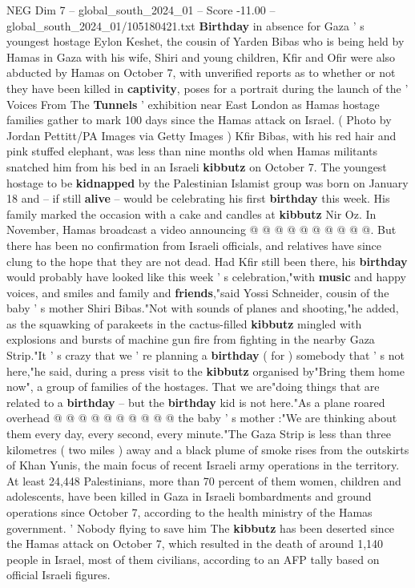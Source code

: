 \begin{textsample}{NEG Dim 7 – global\_south\_2024\_01 – Score -11.00 – global\_south\_2024\_01/105180421.txt}  \label{ex:f7_neg_401}
\textbf{Birthday} in absence for Gaza ' s youngest hostage Eylon Keshet, the cousin of Yarden Bibas who is being held by Hamas in Gaza with his wife, Shiri and young children, Kfir and Ofir were also abducted by Hamas on October 7, with unverified reports as to whether or not they have been killed in \textbf{captivity}, poses for a portrait during the launch of the ' Voices From The \textbf{Tunnels} ' exhibition near East London as Hamas hostage families gather to mark 100 days since the Hamas attack on Israel. ( Photo by Jordan Pettitt/PA Images via Getty Images ) Kfir Bibas, with his red hair and pink stuffed elephant, was less than nine months old when Hamas militants snatched him from his bed in an Israeli \textbf{kibbutz} on October 7.
The youngest hostage to be \textbf{kidnapped} by the Palestinian Islamist group was born on January 18 and -- if still \textbf{alive} -- would be celebrating his first \textbf{birthday} this week.
His family marked the occasion with a cake and candles at \textbf{kibbutz} Nir Oz.
In November, Hamas broadcast a video announcing @ @ @ @ @ @ @ @ @ @.
But there has been no confirmation from Israeli officials, and relatives have since clung to the hope that they are not dead.
Had Kfir still been there, his \textbf{birthday} would probably have looked like this week ' s celebration,"with \textbf{music} and happy voices, and smiles and family and \textbf{friends},"said Yossi Schneider, cousin of the baby ' s mother Shiri Bibas."Not with sounds of planes and shooting,"he added, as the squawking of parakeets in the cactus-filled \textbf{kibbutz} mingled with explosions and bursts of machine gun fire from fighting in the nearby Gaza Strip."It ' s crazy that we ' re planning a \textbf{birthday} ( for ) somebody that ' s not here,"he said, during a press visit to the \textbf{kibbutz} organised by"Bring them home now", a group of families of the hostages.
That we are"doing things that are related to a \textbf{birthday} -- but the \textbf{birthday} kid is not here."As a plane roared overhead @ @ @ @ @ @ @ @ @ @ the baby ' s mother :"We are thinking about them every day, every second, every minute."The Gaza Strip is less than three kilometres ( two miles ) away and a black plume of smoke rises from the outskirts of Khan Yunis, the main focus of recent Israeli army operations in the territory.
At least 24,448 Palestinians, more than 70 percent of them women, children and adolescents, have been killed in Gaza in Israeli bombardments and ground operations since October 7, according to the health ministry of the Hamas government. ' Nobody flying to save him The \textbf{kibbutz} has been deserted since the Hamas attack on October 7, which resulted in the death of around 1,140 people in Israel, most of them civilians, according to an AFP tally based on official Israeli figures.

\end{textsample}
